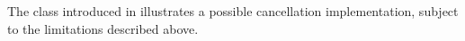 The  class introduced in  illustrates a
possible cancellation implementation, subject to the limitations described
above.


